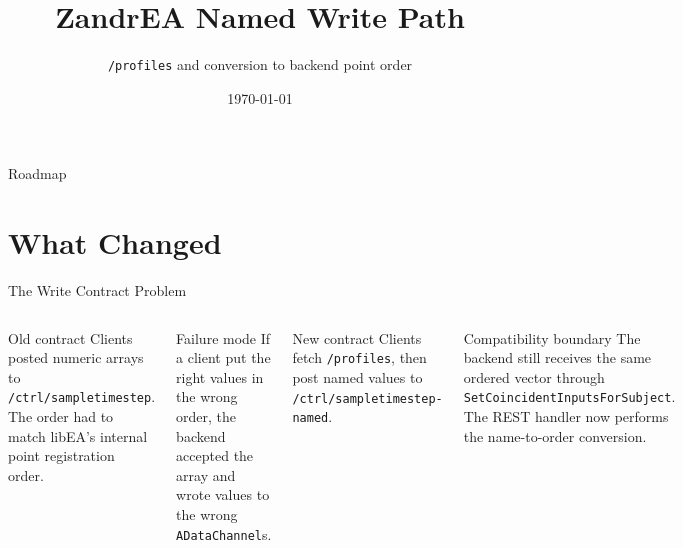 \documentclass[aspectratio=169]{beamer}
\title{ZandrEA Named Write Path}
\subtitle{\texttt{/profiles} and conversion to backend point order}
\author{}
\date{\today}
\begin{document}
\begin{frame}
  \titlepage
\end{frame}

\begin{frame}{Roadmap}
  \tableofcontents
\end{frame}

\section{What Changed}

\begin{frame}{The Write Contract Problem}
\begin{columns}[T]
\begin{block}{Old contract}
  Clients posted numeric arrays to \texttt{/ctrl/sampletimestep}.
  The order had to match libEA's internal point registration order.
\end{block}

\vspace{0.5em}
\begin{block}{Failure mode}
  If a client put the right values in the wrong order, the backend accepted
  the array and wrote values to the wrong \texttt{ADataChannel}s.
\end{block}

\begin{block}{New contract}
  Clients fetch \texttt{/profiles}, then post named values to
  \texttt{/ctrl/sampletimestep-named}.
\end{block}

\vspace{0.5em}
\begin{block}{Compatibility boundary}
  The backend still receives the same ordered vector through
  \texttt{SetCoincidentInputsForSubject}. The REST handler now performs the
  name-to-order conversion.
\end{block}
\end{columns}
\end{frame}
\end{document}
